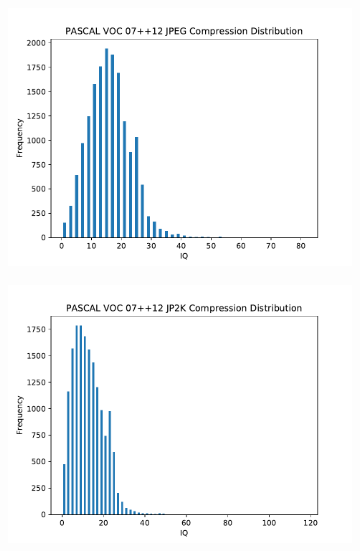 \begin{figure}[H]
\begin{subfigure}[b]{0.4\textwidth}
        \includegraphics[width=\textwidth]{Figs/Implementation/JPEGCompressiondist.pdf}
        \caption{}\label{fig:dist_jp}
    \end{subfigure}
    \begin{subfigure}[b]{0.4\textwidth}
        \center
        \includegraphics[width=\textwidth]{Figs/Implementation/JP2KCompressiondist.pdf}
        \caption{}\label{fig:dist_jk}
    \end{subfigure}
  	\begin{subfigure}[b]{0.4\textwidth}
        \center

\end{subfigure}
\end{figure}
